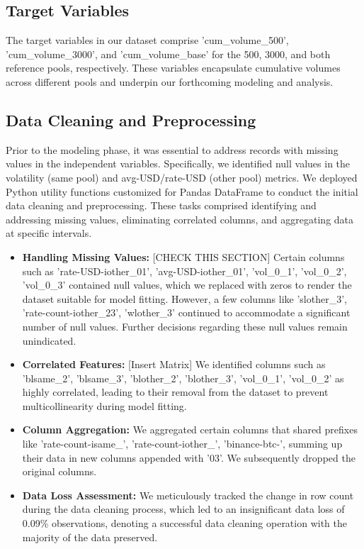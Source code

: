 \documentclass{article}
\begin{document}
\subsection{Target Variables}
The target variables in our dataset comprise 'cum\_volume\_500', 'cum\_volume\_3000', and 'cum\_volume\_base' for the 500, 3000, and both reference pools, respectively. These variables encapsulate cumulative volumes across different pools and underpin our forthcoming modeling and analysis.

\subsection{Data Cleaning and Preprocessing}
Prior to the modeling phase, it was essential to address records with missing values in the independent variables. Specifically, we identified null values in the volatility (same pool) and avg-USD/rate-USD (other pool) metrics. We deployed Python utility functions customized for Pandas DataFrame to conduct the initial data cleaning and preprocessing. These tasks comprised identifying and addressing missing values, eliminating correlated columns, and aggregating data at specific intervals.

\begin{itemize}
    \item \textbf{Handling Missing Values:} [CHECK THIS SECTION] Certain columns such as 'rate-USD-iother\_01', 'avg-USD-iother\_01', 'vol\_0\_1', 'vol\_0\_2', 'vol\_0\_3' contained null values, which we replaced with zeros to render the dataset suitable for model fitting. However, a few columns like 'slother\_3', 'rate-count-iother\_23', 'wlother\_3' continued to accommodate a significant number of null values. Further decisions regarding these null values remain unindicated.
    \item \textbf{Correlated Features:} [Insert Matrix] We identified columns such as 'blsame\_2', 'blsame\_3', 'blother\_2', 'blother\_3', 'vol\_0\_1', 'vol\_0\_2' as highly correlated, leading to their removal from the dataset to prevent multicollinearity during model fitting.
    \item \textbf{Column Aggregation:} We aggregated certain columns that shared prefixes like 'rate-count-isame\_', 'rate-count-iother\_', 'binance-btc-', summing up their data in new columns appended with '03'. We subsequently dropped the original columns.
    \item \textbf{Data Loss Assessment:} We meticulously tracked the change in row count during the data cleaning process, which led to an insignificant data loss of 0.09\% observations, denoting a successful data cleaning operation with the majority of the data preserved.
\end{itemize}
\end{document}

